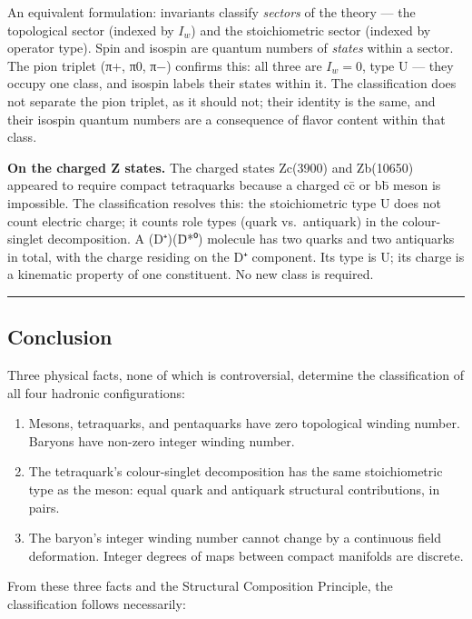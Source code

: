 An equivalent formulation: invariants classify \emph{sectors}
of the theory --- the topological sector (indexed by \(I_w\)) and the
stoichiometric sector (indexed by operator type). Spin and isospin are
quantum numbers of \emph{states} within a sector. The pion triplet (π+,
π0, π−) confirms this: all three are \(I_w = 0\), type U --- they occupy
one class, and isospin labels their states within it. The
classification does not separate the pion triplet, as it should not;
their identity is the same, and their isospin quantum numbers
are a consequence of flavor content within that class.

\textbf{On the charged Z states.} The charged states Zc(3900) and
Zb(10650) appeared to require compact tetraquarks because a charged cc̄
or bb̄ meson is impossible. The classification resolves this: the
stoichiometric type U does not count electric charge; it counts
role types (quark vs.~antiquark) in the colour-singlet
decomposition. A (D⁺)(D̄*⁰) molecule has two quarks and two antiquarks in
total, with the charge residing on the D⁺ component. Its type
is U; its charge is a kinematic property of one constituent. No new
class is required.

\begin{center}\rule{0.5\linewidth}{0.5pt}\end{center}

\hypertarget{conclusion}{%
\subsection{Conclusion}\label{conclusion}}

Three physical facts, none of which is controversial, determine the
classification of all four hadronic configurations:

\begin{enumerate}
\def\labelenumi{\arabic{enumi}.}
\item
  Mesons, tetraquarks, and pentaquarks have zero topological winding
  number. Baryons have non-zero integer winding number.
\item
  The tetraquark's colour-singlet decomposition has the same
  stoichiometric type as the meson: equal quark and antiquark structural
  contributions, in pairs.
\item
  The baryon's integer winding number cannot change by a continuous
  field deformation. Integer degrees of maps between compact manifolds
  are discrete.
\end{enumerate}

From these three facts and the Structural Composition Principle, the
classification follows necessarily:


